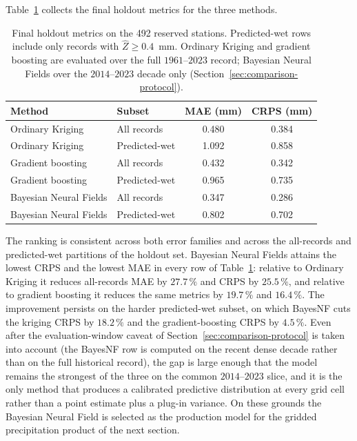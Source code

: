 Table~\ref{tab:final-comparison} collects the final holdout metrics for
the three methods.

\begin{table}[ht]
  \centering
  \caption{Final holdout metrics on the 492 reserved stations.
  Predicted-wet rows include only records with $\hat{Z} \ge 0{.}4$~mm.
  Ordinary Kriging and gradient boosting are evaluated over the full
  $1961$--$2023$ record; Bayesian Neural Fields over the $2014$--$2023$
  decade only (Section~\ref{sec:comparison-protocol}).}
  \label{tab:final-comparison}
  \begin{tabular}{l l cc}
    \toprule
    Method & Subset & MAE (mm) & CRPS (mm) \\
    \midrule
    Ordinary Kriging   & All records   & 0.480 & 0.384 \\
    Ordinary Kriging   & Predicted-wet & 1.092 & 0.858 \\
    \midrule
    Gradient boosting  & All records   & 0.432 & 0.342 \\
    Gradient boosting  & Predicted-wet & 0.965 & 0.735 \\
    \midrule
    Bayesian Neural Fields & All records   & 0.347 & 0.286 \\
    Bayesian Neural Fields & Predicted-wet & 0.802 & 0.702 \\
    \bottomrule
  \end{tabular}
\end{table}

The ranking is consistent across both error families and across the
all-records and predicted-wet partitions of the holdout set. Bayesian
Neural Fields attains the lowest CRPS and the lowest MAE in every row
of Table~\ref{tab:final-comparison}: relative to Ordinary Kriging it
reduces all-records MAE by $27.7\,\%$ and CRPS by $25.5\,\%$, and
relative to gradient boosting it reduces the same metrics by $19.7\,\%$
and $16.4\,\%$. The improvement persists on the harder predicted-wet
subset, on which BayesNF cuts the kriging CRPS by $18.2\,\%$ and the
gradient-boosting CRPS by $4.5\,\%$. Even after the evaluation-window
caveat of Section~\ref{sec:comparison-protocol} is taken into account
(the BayesNF row is computed on the recent dense decade rather than on
the full historical record), the gap is large enough that the model
remains the strongest of the three on the common $2014$--$2023$ slice,
and it is the only method that produces a calibrated predictive
distribution at every grid cell rather than a point estimate plus a
plug-in variance. On these grounds the Bayesian Neural Field is
selected as the production model for the gridded precipitation product
of the next section.

